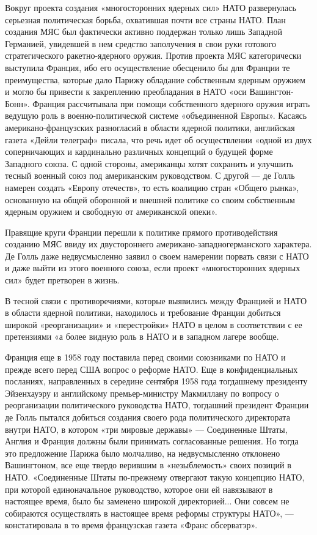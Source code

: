 \documentclass[12pt, a4paper, openany]{book}
\begin{document}
		Вокруг проекта создания «многосторонних ядерных сил» НАТО развернулась серьезная политическая борьба, охватившая почти все страны НАТО. План создания МЯС был фактически активно поддержан только лишь Западной Германией, увидевшей в нем средство заполучения в свои руки готового стратегического ракетно-ядерного оружия. Против проекта МЯС категорически выступила Франция, ибо его осуществление обесценило бы для Франции те преимущества, которые дало Парижу обладание собственным ядерным оружием и могло бы привести к закреплению преобладания в НАТО «оси Вашингтон-Бонн». Франция рассчитывала при помощи собственного ядерного оружия играть ведущую роль в военно-политической системе «объединенной Европы». Касаясь американо-французских разногласий в области ядерной политики, английская газета «Дейли телеграф» писала, что речь идет об осуществлении «одной из двух соперничающих и кардинально различных концепций о будущей форме Западного союза. С одной стороны, американцы хотят сохранить и улучшить тесный военный союз под американским руководством. С другой — де Голль намерен создать «Европу отечеств», то есть коалицию стран «Общего рынка», основанную на общей оборонной и внешней политике со своим собственным ядерным оружием и свободную от американской опеки».
		
		Правящие круги Франции перешли к политике прямого противодействия созданию МЯС ввиду их двустороннего американо-западногерманского характера. Де Голль даже недвусмысленно заявил о своем намерении порвать связи с НАТО и даже выйти из этого военного союза, если проект «многосторонних ядерных сил» будет претворен в жизнь.
		
		В тесной связи с противоречиями, которые выявились между Францией и НАТО в области ядерной политики, находилось и требование Франции добиться широкой «реорганизации» и «перестройки» НАТО в целом в соответствии с ее претензиями «а более видную роль в НАТО и в западном лагере вообще.
		
		Франция еще в 1958 году поставила перед своими союзниками по НАТО и прежде всего перед США вопрос о реформе НАТО. Еще в конфиденциальных посланиях, направленных в середине сентября 1958 года тогдашнему президенту Эйзенхауэру и английскому премьер-министру Макмиллану по вопросу о реорганизации политического руководства НАТО, тогдашний президент Франции де Голль пытался добиться создания своего рода политического директората внутри НАТО, в котором «три мировые державы» — Соединенные Штаты, Англия и Франция должны были принимать согласованные решения. Но тогда это предложение Парижа было молчаливо, на недвусмысленно отклонено Вашингтоном, все еще твердо верившим в «незыблемость» своих позиций в НАТО. «Соединенные Штаты по-прежнему отвергают такую концепцию НАТО, при которой единоначальное руководство, которое они ей навязывают в настоящее время, было бы заменено широкой директорией... Они совсем не собираются осуществлять в настоящее время реформы структуры НАТО», — констатировала в то время французская газета «Франс обсерватэр».
		
\end{document}
